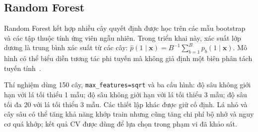 \subsection{Random Forest}
\label{subsec:2_4_3}
Random Forest kết hợp nhiều cây quyết định được học trên các mẫu bootstrap và các tập thuộc tính ứng viên ngẫu nhiên. Trong triển khai này, xác suất lớp dương là trung bình xác suất từ các cây: $\hat p(1\mid\mathbf{x})=B^{-1}\sum_{b=1}^{B}p_b(1\mid\mathbf{x})$. Mô hình có thể biểu diễn tương tác phi tuyến mà không giả định một biên phân tách tuyến tính~\cite{sklearn-rf}.

Thí nghiệm dùng 150 cây, \texttt{max\_features=sqrt} và ba cấu hình: độ sâu không giới hạn với lá tối thiểu 1 mẫu; độ sâu không giới hạn với lá tối thiểu 3 mẫu; độ sâu tối đa 20 với lá tối thiểu 3 mẫu. Các thiết lập khác được giữ cố định. Lá nhỏ và cây sâu có thể tăng khả năng khớp train nhưng cũng tăng chi phí bộ nhớ và nguy cơ quá khớp; kết quả CV được dùng để lựa chọn trong phạm vi đã khảo sát.
